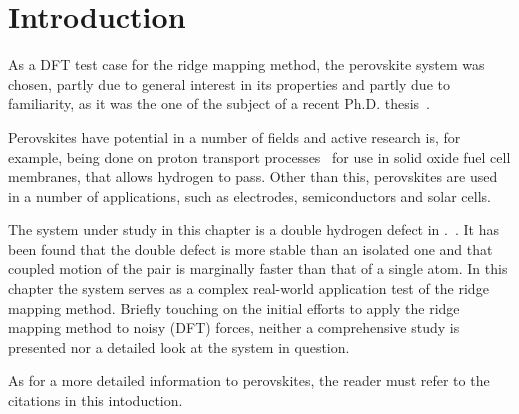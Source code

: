 \section{Introduction}
\label{sec:perovskites-introduction}

As a DFT test case for the ridge mapping method, the  perovskite system was chosen, partly due to general interest in its properties and partly due to familiarity, as it was the one of the subject of a recent Ph.D. thesis~\cite{nicolai-2010}.

Perovskites have potential in a number of fields and active research is, for example, being done on proton transport processes~\cite{perovskites-hydrogen-diffusion-2007, perovskites-proton-transport-2008} for use in solid oxide fuel cell membranes, that allows hydrogen to pass\cite{perovskites-in-fuel-cells-1981}.
Other than this, perovskites are used in a number of applications, such as electrodes, semiconductors and solar cells.

The system under study in this chapter is a double hydrogen defect in .~\cite{double-defect-2011}.
It has been found that the double defect is more stable than an isolated one and that coupled motion of the pair is marginally faster than that of a single atom.
In this chapter the system serves as a complex real-world application test of the ridge mapping method.
Briefly touching on the initial efforts to apply the ridge mapping method to noisy (DFT) forces, neither a comprehensive study is presented nor a detailed look at the system in question.

As for a more detailed information to perovskites, the reader must refer to the citations in this intoduction.





